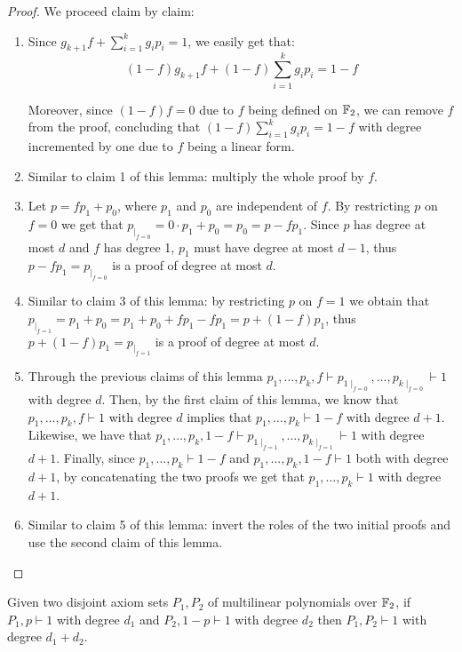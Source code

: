 \begin{proof}
 We proceed claim by claim:
    \begin{enumerate}
        \item Since $g_{k+1}f + \sum_{i = 1}^k g_i p_i = 1$, we easily get that:
        \[(1-f)g_{k+1}f + (1-f)\sum_{i = 1}^k g_i p_i = 1-f\]
        
 Moreover, since $(1-f) f = 0$ due to $f$ being defined on $\mathbb{F}_2$, we can remove $f$ from the proof, concluding that $(1-f)\sum_{i = 1}^k g_i p_i = 1-f$ with degree incremented by one due to  $f$ being a linear form.
    
        \item Similar to claim 1 of this lemma: multiply the whole proof by $f$.
        
        \item Let $p = f p_1 + p_0$, where $p_1$ and $p_0$ are independent of $f$. By restricting $p$ on $f = 0$ we get that $p_{\mid_{f=0}} = 0 \cdot p_1 + p_0 = p_0 = p - f p_1$. Since $p$ has degree at most $d$ and $f$ has degree 1, $p_1$ must have degree at most $d-1$, thus $p - f p_1 = p_{\mid_{f=0}}$ is a proof of degree at most $d$.
        
        \item Similar to claim 3 of this lemma: by restricting $p$ on $f=1$ we obtain that $p_{\mid_{f=1}} = p_1 + p_0 = p_1 + p_0 + fp_1 - fp_1 = p+(1-f)p_1$, thus $p + (1-f)p_1 = p_{\mid_{f=1}}$ is a proof of degree at most $d$.

        \item Through the previous claims of this lemma $p_1, \ldots, p_k, f \vdash p_{1\mid_{f=0}}, \ldots, p_{k\mid_{f=0}} \vdash 1$ with degree $d$. Then, by the first claim of this lemma, we know that $p_1, \ldots, p_k, f \vdash  1$ with degree $d$ implies that $p_1, \ldots, p_k \vdash 1-f$ with degree $d+1$. Likewise, we have that $p_1, \ldots, p_k, 1-f \vdash p_{1\mid_{f=1}}, \ldots, p_{k\mid_{f=1}} \vdash 1$ with degree $d+1$. Finally, since $p_1, \ldots, p_k \vdash 1-f$ and $p_1, \ldots, p_k, 1-f \vdash 1$ both with degree $d+1$, by concatenating the two proofs we get that $p_1, \ldots, p_k \vdash 1$ with degree $d+1$.

        \item Similar to claim 5 of this lemma: invert the roles of the two initial proofs and use the second claim of this lemma.
    \end{enumerate}
\end{proof}

\begin{lemma}
    \label{union_ref}
 Given two disjoint axiom sets $P_1, P_2$ of multilinear polynomials over $\mathbb{F}_2$, if $P_1, p \vdash 1$ with degree $d_1$ and $P_2, 1-p \vdash 1$ with degree $d_2$ then $P_1, P_2 \vdash 1$ with degree $d_1 + d_2$.
\end{lemma}


